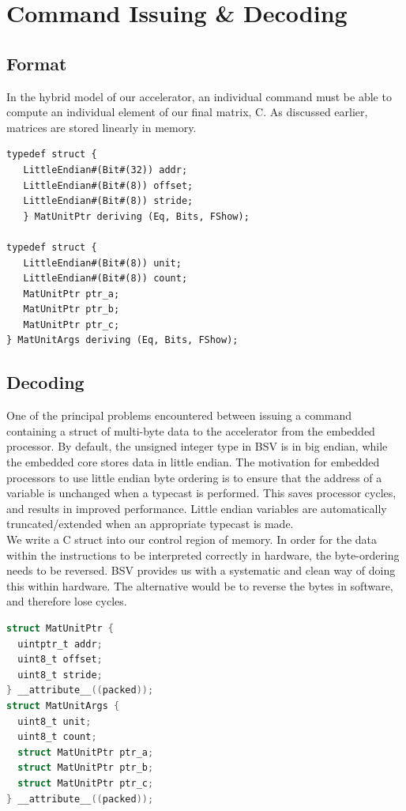 \documentclass[a4paper,8pt]{report}
\begin{document}
\section{Command Issuing \& Decoding}
\subsection{Format}
In the hybrid model of our accelerator, an individual command must be able to
compute an individual element of our final matrix, C. As discussed earlier,
matrices are stored linearly in memory. 

\scriptsize
\begin{verbatim}
typedef struct {
   LittleEndian#(Bit#(32)) addr;
   LittleEndian#(Bit#(8)) offset;
   LittleEndian#(Bit#(8)) stride;
   } MatUnitPtr deriving (Eq, Bits, FShow);

typedef struct {
   LittleEndian#(Bit#(8)) unit;
   LittleEndian#(Bit#(8)) count;
   MatUnitPtr ptr_a;
   MatUnitPtr ptr_b;
   MatUnitPtr ptr_c;
} MatUnitArgs deriving (Eq, Bits, FShow);

\end{verbatim}
\normalsize

\subsection{Decoding}
One of the principal problems encountered between issuing a command containing
a struct of multi-byte data to the accelerator from the embedded processor. By
default, the unsigned integer type in BSV is in big endian, while the
embedded core stores data in little endian. The motivation for embedded
processors to use little endian byte ordering is to ensure that the address of a
variable is unchanged when a typecast is performed. This saves processor cycles,
and results in improved performance. Little endian variables are automatically
truncated/extended when an appropriate typecast is made.\\

We write a C struct into our control region of memory. In order for the data
within the instructions to be interpreted correctly in hardware, the
byte-ordering needs to be reversed. BSV provides us with a systematic and clean
way of doing this within hardware. The alternative would be to reverse the bytes
in software, and therefore lose cycles. \\

\begin{lstlisting}[language=C,style=customc]
struct MatUnitPtr {
  uintptr_t addr;
  uint8_t offset;
  uint8_t stride;
} __attribute__((packed));
struct MatUnitArgs {
  uint8_t unit;
  uint8_t count;
  struct MatUnitPtr ptr_a;
  struct MatUnitPtr ptr_b;
  struct MatUnitPtr ptr_c;
} __attribute__((packed));
\end{lstlisting}
\end{document}

